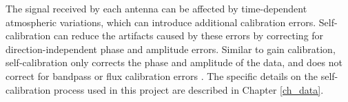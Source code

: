 The signal received by each antenna can be affected by time-dependent atmospheric variations, which can introduce additional calibration errors. Self-calibration can reduce the artifacts caused by these errors by correcting for direction-independent phase and amplitude errors. Similar to gain calibration, self-calibration only corrects the phase and amplitude of the data, and does not correct for bandpass or flux calibration errors \citep{Marvil2}. The specific details on the self-calibration process used in this project are described in Chapter \ref{ch_data}. 
